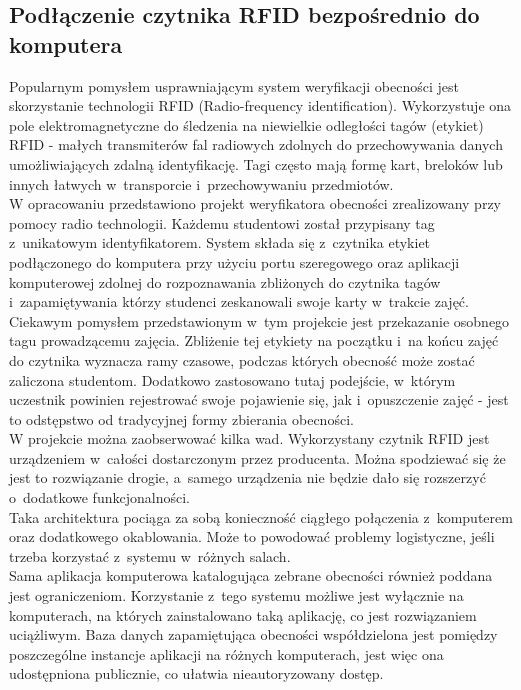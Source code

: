 \documentclass[declaration,shortabstract, mgr]{iithesis}
\begin{document}
\subsection{Podłączenie czytnika RFID bezpośrednio do komputera}
\indent Popularnym pomysłem usprawniającym system weryfikacji obecności jest skorzystanie technologii RFID (Radio-frequency identification). Wykorzystuje ona pole elektromagnetyczne do śledzenia na niewielkie odległości tagów (etykiet) RFID\cite{rfid_itself} - małych transmiterów fal radiowych zdolnych do przechowywania danych umożliwiających zdalną identyfikację. Tagi często mają formę kart, breloków lub innych łatwych w~transporcie i~przechowywaniu przedmiotów.\\
\indent W opracowaniu \cite{rfid_serial} przedstawiono projekt weryfikatora obecności zrealizowany przy pomocy radio technologii. Każdemu studentowi został przypisany tag z~unikatowym identyfikatorem. System składa się z~czytnika etykiet podłączonego do komputera przy użyciu portu szeregowego oraz aplikacji komputerowej zdolnej do rozpoznawania zbliżonych do czytnika tagów i~zapamiętywania którzy studenci zeskanowali swoje karty w~trakcie zajęć. \\
\indent Ciekawym pomysłem przedstawionym w~tym projekcie jest przekazanie osobnego tagu prowadzącemu zajęcia. Zbliżenie tej etykiety na początku i~na końcu zajęć do czytnika wyznacza ramy czasowe, podczas których obecność może zostać zaliczona studentom. Dodatkowo zastosowano tutaj podejście, w~którym uczestnik powinien rejestrować swoje pojawienie się, jak i~opuszczenie zajęć - jest to odstępstwo od tradycyjnej formy zbierania obecności. \\
\indent W projekcie można zaobserwować kilka wad. Wykorzystany czytnik RFID jest urządzeniem w~całości dostarczonym przez producenta. Można spodziewać się że jest to rozwiązanie drogie, a~samego urządzenia nie będzie dało się rozszerzyć o~dodatkowe funkcjonalności. \\
\indent Taka architektura pociąga za sobą konieczność ciągłego połączenia z~komputerem oraz dodatkowego okablowania. Może to powodować problemy logistyczne, jeśli trzeba korzystać z~systemu w~różnych salach.\\
\indent Sama aplikacja komputerowa katalogująca zebrane obecności również poddana jest ograniczeniom. Korzystanie z~tego systemu możliwe jest wyłącznie na komputerach, na których zainstalowano taką aplikację, co jest rozwiązaniem uciążliwym. Baza danych zapamiętująca obecności współdzielona jest pomiędzy poszczególne instancje aplikacji na różnych komputerach, jest więc ona udostępniona publicznie, co ułatwia nieautoryzowany dostęp.
\end{document}
